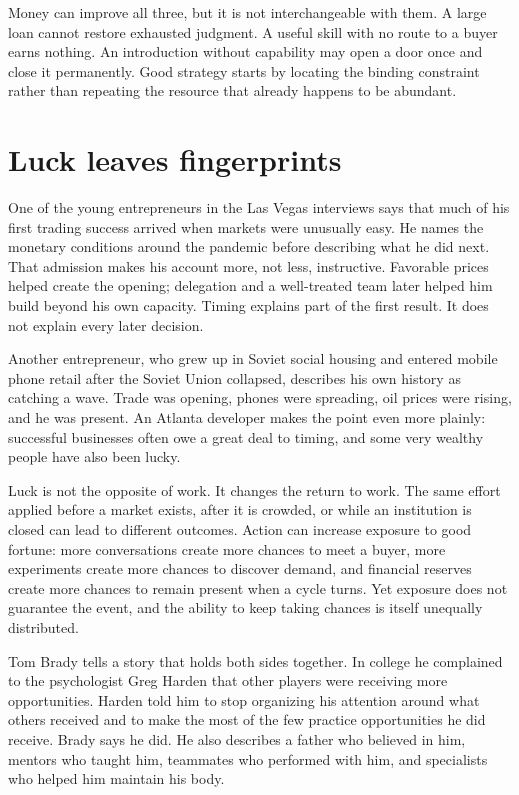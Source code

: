Money can improve all three, but it is not interchangeable with them. A large
loan cannot restore exhausted judgment. A useful skill with no route to a
buyer earns nothing. An introduction without capability may open a door once
and close it permanently. Good strategy starts by locating the binding
constraint rather than repeating the resource that already happens to be
abundant.

\section{Luck leaves fingerprints}

One of the young entrepreneurs in the Las Vegas interviews says that much of
his first trading success arrived when markets were unusually easy. He names
the monetary conditions around the pandemic before describing what he did next.
That admission makes his account more, not less, instructive. Favorable prices
helped create the opening; delegation and a well-treated team later helped him
build beyond his own capacity. Timing explains part of the first result. It
does not explain every later decision.

Another entrepreneur, who grew up in Soviet social housing and entered mobile
phone retail after the Soviet Union collapsed, describes his own history as
catching a wave. Trade was opening, phones were spreading, oil prices were
rising, and he was present. An Atlanta developer makes the point even more
plainly: successful businesses often owe a great deal to timing, and some very
wealthy people have also been lucky.

Luck is not the opposite of work. It changes the return to work. The same
effort applied before a market exists, after it is crowded, or while an
institution is closed can lead to different outcomes. Action can increase
exposure to good fortune: more conversations create more chances to meet a
buyer, more experiments create more chances to discover demand, and financial
reserves create more chances to remain present when a cycle turns. Yet exposure
does not guarantee the event, and the ability to keep taking chances is itself
unequally distributed.

Tom Brady tells a story that holds both sides together. In college he
complained to the psychologist Greg Harden that other players were receiving
more opportunities. Harden told him to stop organizing his attention around
what others received and to make the most of the few practice opportunities he
did receive. Brady says he did. He also describes a father who believed in him,
mentors who taught him, teammates who performed with him, and specialists who
helped him maintain his body.


